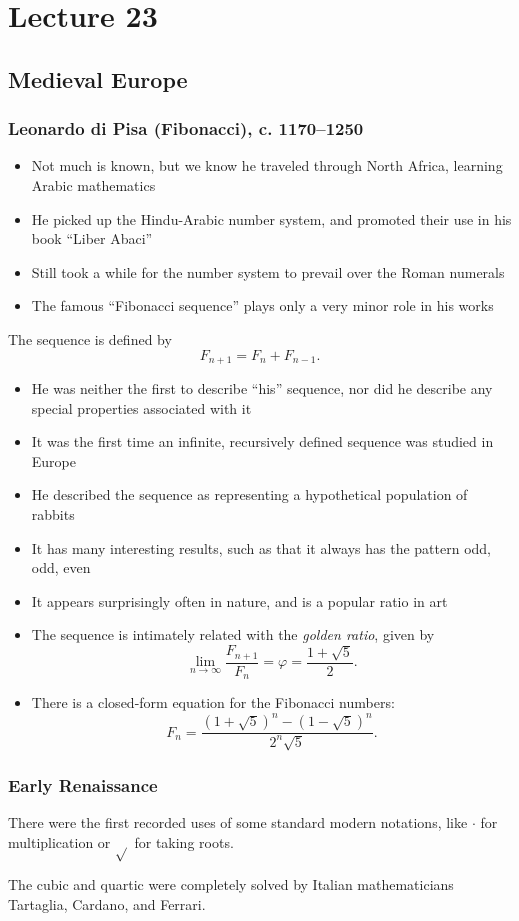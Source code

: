 \documentclass[class=article, crop=false]{standalone}
\begin{document}
  \section{Lecture 23}
  \subsection{Medieval Europe}
  \subsubsection{Leonardo di Pisa (Fibonacci), c. 1170--1250}
  \begin{itemize}
    \item Not much is known, but we know he traveled through North Africa, learning Arabic mathematics
    \item He picked up the Hindu-Arabic number system, and promoted their use in his book ``Liber Abaci''
    \item Still took a while for the number system to prevail over the Roman numerals
    \item The famous ``Fibonacci sequence'' plays only a very minor role in his works
  \end{itemize}
  The sequence is defined by
  \[
    F_{n + 1} = F_n + F_{n - 1}.
  \]
  \begin{itemize}
    \item He was neither the first to describe ``his'' sequence, nor did he describe any special properties associated with it
    \item It was the first time an infinite, recursively defined sequence was studied in Europe
    \item He described the sequence as representing a hypothetical population of rabbits
    \item It has many interesting results, such as that it always has the pattern odd, odd, even
    \item It appears surprisingly often in nature, and is a popular ratio in art
    \item The sequence is intimately related with the \emph{golden ratio}, given by
    \[
      \lim_{n\to \infty} \frac{F_{n + 1}}{F_n} = \varphi = \frac{1 + \sqrt{5}}{2}.
    \]
    \item There is a closed-form equation for the Fibonacci numbers:
    \[
      F_n = \frac{(1 + \sqrt{5})^n - (1 - \sqrt{5})^n}{2^n\sqrt{5}}.
    \]
  \end{itemize}
  \subsubsection{Early Renaissance}
  There were the first recorded uses of some standard modern notations, like $\cdot$ for multiplication or $\sqrt{}$ for taking roots. \par
  The cubic and quartic were completely solved by Italian mathematicians Tartaglia, Cardano, and Ferrari.
\end{document}
